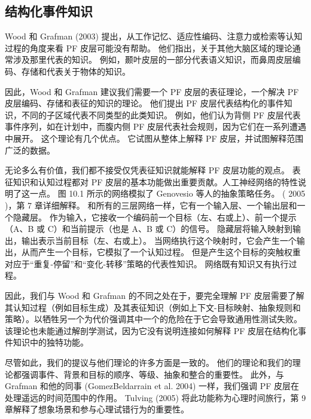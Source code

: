 \subsection{结构化事件知识}
Wood 和 Grafman (2003) 提出，从工作记忆、适应性编码、注意力或检索等认知过程的角度来看 PF 皮层可能没有帮助。 他们指出，关于其他大脑区域的理论通常涉及那里代表的知识。 例如，颞叶皮层的一部分代表语义知识，而鼻周皮层编码、存储和代表关于物体的知识。
\par 
因此，Wood 和 Grafman 建议我们需要一个 PF 皮层的表征理论，一个解决 PF 皮层编码、存储和表征的知识的理论。 他们提出 PF 皮层代表结构化的事件知识，不同的子区域代表不同类型的此类知识。 例如，他们认为背侧 PF 皮层代表事件序列，如在计划中，而腹内侧 PF 皮层代表社会规则，因为它们在一系列遭遇中展开。 这个理论有几个优点。 它试图从整体上解释 PF 皮层，并试图解释范围广泛的数据。
\par 
无论多么有价值，我们都不接受仅凭表征知识就能解释 PF 皮层功能的观点。 表征知识和认知过程都对 PF 皮层的基本功能做出重要贡献。人工神经网络的特性说明了这一点。 图 10.1 所示的网络模拟了 Genovesio 等人的抽象策略任务。 ( 2005 )，第 7 章详细解释。 和所有的三层网络一样，它有一个输入层、一个输出层和一个隐藏层。 作为输入，它接收一个编码前一个目标（左、右或上）、前一个提示（A、B 或 C）和当前提示（也是 A、B 或 C）的信号。 隐藏层将输入映射到输出，输出表示当前目标（左、右或上）。 当网络执行这个映射时，它会产生一个输出，从而产生一个目标，它模拟了一个认知过程。 但是产生这个目标的突触权重对应于“重复-停留”和“变化-转移”策略的代表性知识。 网络既有知识又有执行过程。
\par 
因此，我们与 Wood 和 Grafman 的不同之处在于，要完全理解 PF 皮层需要了解其认知过程（例如目标生成）及其表征知识（例如上下文-目标映射、抽象规则和策略）。以牺牲另一个为代价强调其中一个的危险在于它会导致通用性测试失败。 该理论也未能通过解剖学测试，因为它没有说明连接如何解释 PF 皮层在结构化事件知识中的独特功能。
\par 
尽管如此，我们的提议与他们理论的许多方面是一致的。 他们的理论和我们的理论都强调事件、背景和目标的顺序、等级、抽象和整合的重要性。 此外，与 Grafman 和他的同事 (GomezBeldarrain et al. 2004) 一样，我们强调 PF 皮层在处理遥远的时间范围中的作用。 Tulving (2005) 将此功能称为心理时间旅行，第 9 章解释了想象场景和参与心理试错行为的重要性。
